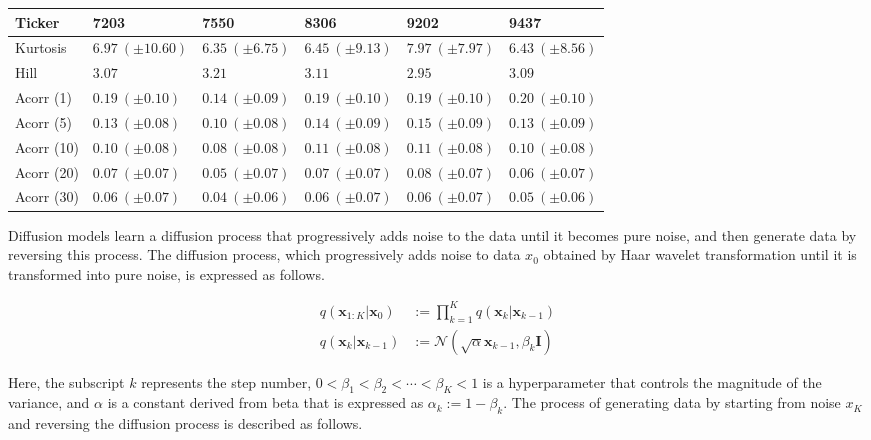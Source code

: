 \documentclass{article}
\begin{document}
\begin{table}[t]
\vspace{0.1cm}
\begin{tabular}{l|lllll}
\toprule
Ticker  & 7203 & 7550 & 8306 & 9202 & 9437 \\
\midrule
Kurtosis  & \(6.97~(\pm10.60)\) & \(6.35~(\pm6.75)\) & \(6.45~(\pm9.13)\) & \(7.97~(\pm7.97)\) & \(6.43~(\pm8.56)\) \\
Hill      & \(3.07\)           & \(3.21\)           & \(3.11\)           & \(2.95\)           & \(3.09\) \\
Acorr (1) & \(0.19~(\pm0.10)\) & \(0.14~(\pm0.09)\) & \(0.19~(\pm0.10)\) & \(0.19~(\pm0.10)\) & \(0.20~(\pm0.10)\) \\
Acorr (5) & \(0.13~(\pm0.08)\) & \(0.10~(\pm0.08)\) & \(0.14~(\pm0.09)\) & \(0.15~(\pm0.09)\) & \(0.13~(\pm0.09)\) \\
Acorr (10)& \(0.10~(\pm0.08)\) & \(0.08~(\pm0.08)\) & \(0.11~(\pm0.08)\) & \(0.11~(\pm0.08)\) & \(0.10~(\pm0.08)\) \\
Acorr (20)& \(0.07~(\pm0.07)\) & \(0.05~(\pm0.07)\) & \(0.07~(\pm0.07)\) & \(0.08~(\pm0.07)\) & \(0.06~(\pm0.07)\) \\
Acorr (30)& \(0.06~(\pm0.07)\) & \(0.04~(\pm0.06)\) & \(0.06~(\pm0.07)\) & \(0.06~(\pm0.07)\) & \(0.05~(\pm0.06)\) \\
\bottomrule
\end{tabular}
\label{Tab:result_realdata}
\end{table}


Diffusion models learn a diffusion process that progressively adds noise to the data until it becomes pure noise, and then generate data by reversing this process.
The diffusion process, which progressively adds noise to data $x_0$ obtained by Haar wavelet transformation until it is transformed into pure noise, is expressed as follows.

\begin{equation}
  \begin{split}
    q(\bm{x}_{1:K}|\bm{x}_0) &:= \prod_{k=1}^K q(\bm{x}_k | \bm{x}_{k-1}) \\
    q(\bm{x}_k | \bm{x}_{k-1}) &:= \mathcal{N} (\sqrt{\alpha}\bm{x}_{k-1}, \beta_k \bm{I})
  \end{split}
\end{equation}

Here, the subscript $k$ represents the step number, $0<\beta_1 < \beta_2 < \cdots < \beta_K < 1$ is a hyperparameter that controls the magnitude of the variance, and $\alpha$ is a constant derived from beta that is expressed as $\alpha_k := 1 - \beta_k$.
The process of generating data by starting from noise $x_K$ and reversing the diffusion process is described as follows. 
\end{document}

